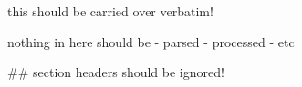 
this should be carried over verbatim!

nothing in here should be
- parsed
- processed
- etc

## section headers should be ignored!
